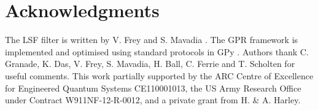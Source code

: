 \section{Acknowledgments}
 The LSF filter is written by V. Frey and S. Mavadia \cite{mavadia2017}. The GPR framework is implemented and optimised using standard protocols in GPy \cite{gpy2014}. Authors thank C. Granade, K. Das, V. Frey, S. Mavadia, H. Ball, C. Ferrie and T. Scholten for useful comments. This work partially supported by the ARC Centre of Excellence for Engineered Quantum Systems CE110001013, the US Army Research Office under Contract W911NF-12-R-0012, and a private grant from H. \& A. Harley.
 



